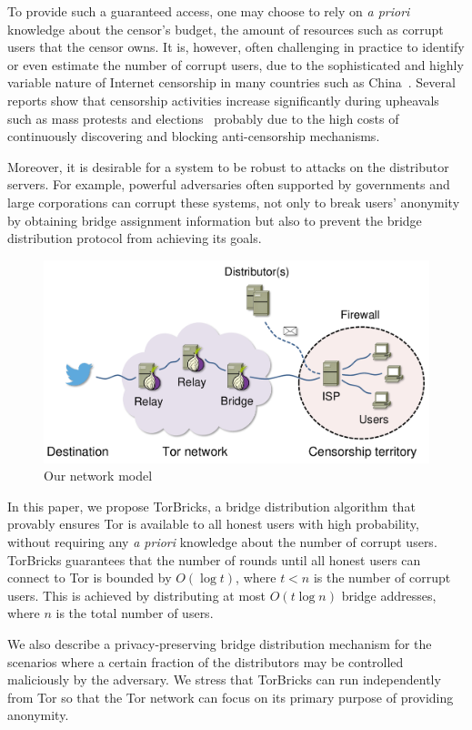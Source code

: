 \documentclass[letterpaper,twocolumn,10pt]{article}
\newcommand{\bricks}{}
\def\bricks/{\mbox{TorBricks}}
\begin{document}
To provide such a guaranteed access, one may choose to rely on \emph{a priori} knowledge about the censor's budget, the amount of resources such as corrupt users that the censor owns. It is, however, often challenging in practice to identify or even estimate the number of corrupt users, due to the sophisticated and highly variable nature of Internet censorship in many countries such as China~\cite{Oni:2012:China,Ensafi2015b}. Several reports show that censorship activities increase significantly during upheavals such as mass protests and elections~\cite{Dainotti:2011, washingtonpost:2009} probably due to the high costs of continuously discovering and blocking anti-censorship mechanisms.

Moreover, it is desirable for a system to be robust to attacks on the distributor servers. For example, powerful adversaries often supported by governments and large corporations can corrupt these systems, not only to break users' anonymity by obtaining bridge assignment information but also to prevent the bridge distribution protocol from achieving its goals.%

\begin{figure}[t]
	\centering
	\includegraphics[width=0.6\linewidth]{images/model.pdf}
	\caption{Our network model}
	\label{fig:model}
\end{figure}

In this paper, we propose \bricks/, a bridge distribution algorithm that provably ensures Tor is available to all honest users with high probability, without requiring any \emph{a priori} knowledge about the number of corrupt users. \bricks/ guarantees that the number of rounds until all honest users can connect to Tor is bounded by $O(\log{t})$, where ${t<n}$ is the number of corrupt users. This is achieved by distributing at most $O(t\log{n})$ bridge addresses, where $n$ is the total number of users.

We also describe a privacy-preserving bridge distribution mechanism for the scenarios where a certain fraction of the distributors may be controlled maliciously by the adversary. 
We stress that \bricks/ can run independently from Tor so that the Tor network can focus on its primary purpose of providing anonymity.
\end{document}
